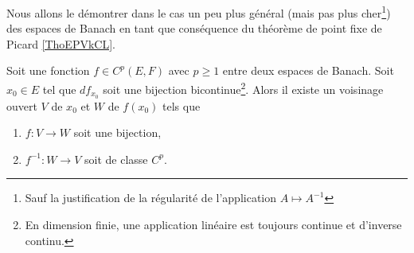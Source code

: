 Nous allons le démontrer dans le cas un peu plus général (mais pas plus cher\footnote{Sauf la justification de la régularité de l'application \( A\mapsto A^{-1}\)}) des espaces de Banach en tant que conséquence du théorème de point fixe de Picard \ref{ThoEPVkCL}.

\begin{theorem} \label{ThoXWpzqCn}
    Soit une fonction \( f\in C^p(E,F)\) avec \( p\geq 1\) entre deux espaces de Banach. Soit \( x_0\in E\) tel que \( df_{x_0}\) soit une bijection bicontinue\footnote{En dimension finie, une application linéaire est toujours continue et d'inverse continu.}. Alors il existe un voisinage ouvert \( V\) de \( x_0\) et \( W\) de \( f(x_0)\) tels que
    \begin{enumerate}
        \item
        \( f\colon V\to W\) soit une bijection,
    \item
        \( f^{-1}\colon W\to V\) soit de classe \( C^p\).
    \end{enumerate}
\end{theorem}

